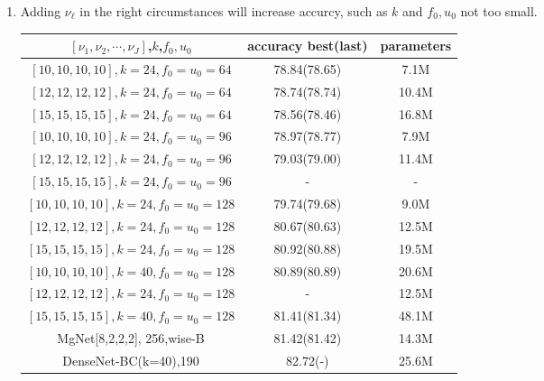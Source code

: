 \begin{enumerate}
\newpage
\item Adding $\nu_{\ell}$ in the right circumstances will increase accurcy, such as $k$ and $f_0,u_0$ not too small.
\begin{table}[!htbp]
	\begin{center}
			\begin{tabular}{|c|c|c|}
                \hline
				$[\nu_1,\nu_2,\cdots,\nu_J]$,$k$,$f_0,u_0$              &  accuracy best(last)  &   parameters \tabularnewline
				\hline		
				$[10,10,10,10],k=24,f_0=u_0=64$                         &  78.84(78.65)         &     7.1M        \tabularnewline
				\hline
                $[12,12,12,12],k=24,f_0=u_0=64 $                        &  78.74(78.74)         &     10.4M        \tabularnewline		
                \hline
                $[15,15,15,15],k=24,f_0=u_0=64 $                        &  78.56(78.46)         &     16.8M        \tabularnewline		
                \hline
                \hline
                $[10,10,10,10],k=24,f_0=u_0=96$                         &  78.97(78.77)         &     7.9M        \tabularnewline		
                \hline		
				$[12,12,12,12],k=24,f_0=u_0=96$                         &  79.03(79.00)         &     11.4M        \tabularnewline
                \hline
                $[15,15,15,15],k=24,f_0=u_0=96$                         &  -                    &     -             \tabularnewline		
                \hline
                \hline
                $[10,10,10,10],k=24,f_0=u_0=128$                        &  79.74(79.68)         &     9.0M        \tabularnewline		
                \hline	
				$[12,12,12,12],k=24,f_0=u_0=128$                        &  80.67(80.63)         &     12.5M        \tabularnewline
                \hline		
				$[15,15,15,15],k=24,f_0=u_0=128$                        &  80.92(80.88)         &     19.5M        \tabularnewline
                \hline
                \hline
                $[10,10,10,10],k=40,f_0=u_0=128$                        &  80.89(80.89)         &     20.6M        \tabularnewline
                \hline
                $[12,12,12,12],k=24,f_0=u_0=128$                        &  -                    &     12.5M        \tabularnewline
                \hline
                $[15,15,15,15],k=40,f_0=u_0=128$                        &  81.41(81.34)         &     48.1M        \tabularnewline
                \hline
                \hline
                MgNet[8,2,2,2], 256,wise-B                    &  81.42(81.42)         &     14.3M        \tabularnewline
                \hline
                DenseNet-BC(k=40),190                         &  82.72(-)             &     25.6M        \tabularnewline
                \hline
			\end{tabular}
	\end{center}
\end{table}
\end{enumerate}
